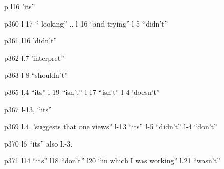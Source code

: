 p l16 'its''

p360 l-17 `` looking'' .. l-16 ``and trying'' l-5 ``didn't''

p361 l16 'didn't''

p362 l.7 'interpret''

p363 l-8 ``shouldn't''

p365 l.4 ``its'' l-19 ``isn't'' l-17 ``isn't'' l-4 'doesn't''

p367 l-13, ``its''

p369 l.4, 'suggests that one views'' l-13 ``its'' l-5 ``didn't'' l-4 ``don't''

p370 l6 ``its'' also l.-3.

p371 l14 ``its'' l18 ``don't'' l20 ``in which I was working'' l.21 ``wasn't''


